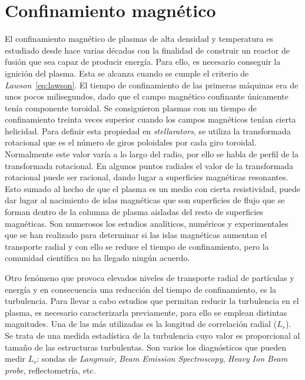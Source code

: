 \section{Confinamiento magnético}\label{sec:confinement}
El confinamiento magnético de plasmas de alta densidad y temperatura es estudiado
desde hace varias décadas con la finalidad de construir un reactor de fusión que sea capaz
de producir energía. Para ello, es necesario conseguir la ignición del plasma. Esta se alcanza
cuando se cumple el criterio de \textit{Lawson}~\eqref{eq:lawson}.
El tiempo de confinamiento de las primeras máquinas era de unos pocos milisegundos, dado
que el campo magnético confinante únicamente tenía componente toroidal. Se consiguieron
plasmas con un tiempo de confinamiento treinta veces superior cuando los campos magnéticos
tenían cierta helicidad. Para definir esta propiedad en \textit{stellarators}, se utiliza la transformada
rotacional que es el número de giros poloidales por cada giro toroidal. Normalmente este
valor varía a lo largo del radio, por ello se habla de perfil de la transformada rotacional. En
algunos puntos radiales el valor de la transformada rotacional puede ser racional, dando lugar
a superficies magnéticas resonantes. Esto sumado al hecho de que el plasma es un medio con
cierta resistividad, puede dar lugar al nacimiento de islas magnéticas que son superficies de
flujo que se forman dentro de la columna de plasma aisladas del resto de superficies magnéticas.
Son numerosos los estudios analíticos, numéricos y experimentales que se han realizado
para determinar si las islas magnéticas aumentan el transporte radial y con ello se reduce el
tiempo de confinamiento, pero la comunidad científica no ha llegado ningún acuerdo.\par
Otro fenómeno que provoca elevados niveles de transporte radial de partículas y energía
y en consecuencia una reducción del tiempo de confinamiento, es la turbulencia. Para llevar a
cabo estudios que permitan reducir la turbulencia en el plasma, es necesario caracterizarla
previamente, para ello se emplean distintas magnitudes. Una de las más utilizadas es la longitud
de correlación radial ($L_r$). Se trata de una medida estadística de la turbulencia cuyo
valor es proporcional al tamaño de las estructuras turbulentas.
Son varios los diagnósticos que pueden medir $L_r$: sondas de \textit{Langmuir}, \textit{Beam Emission Spectroscopy},
\textit{Heavy Ion Beam probe}, reflectometría, etc.
